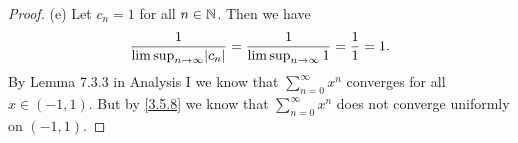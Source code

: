 \begin{proof}{(e)}
  Let \(c_n = 1\) for all \(n \in \mathbb{N}\).
  Then we have
  \[
    \dfrac{1}{\limsup_{n \to \infty} \abs{c_n}} = \dfrac{1}{\limsup_{n \to \infty} 1} = \dfrac{1}{1} = 1.
  \]
  By Lemma 7.3.3 in Analysis I we know that \(\sum_{n = 0}^\infty x^n\) converges for all \(x \in (-1, 1)\).
  But by \cref{3.5.8} we know that \(\sum_{n = 0}^\infty x^n\) does not converge uniformly on \((-1, 1)\).
\end{proof}